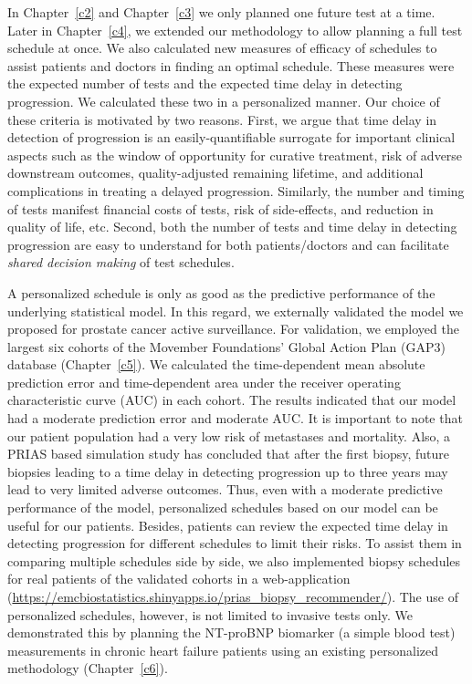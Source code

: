 In Chapter~\ref{c2} and Chapter~\ref{c3} we only planned one future test at a time. Later in Chapter~\ref{c4}, we extended our methodology to allow planning a full test schedule at once. We also calculated new measures of efficacy of schedules to assist patients and doctors in finding an optimal schedule. These measures were the expected number of tests and the expected time delay in detecting progression. We calculated these two in a personalized manner. Our choice of these criteria is motivated by two reasons. First, we argue that time delay in detection of progression is an easily-quantifiable surrogate for important clinical aspects such as the window of opportunity for curative treatment, risk of adverse downstream outcomes, quality-adjusted remaining lifetime, and additional complications in treating a delayed progression. Similarly, the number and timing of tests manifest financial costs of tests, risk of side-effects, and reduction in quality of life, etc. Second, both the number of tests and time delay in detecting progression are easy to understand for both patients/doctors and can facilitate \emph{shared decision making} of test schedules.

A personalized schedule is only as good as the predictive performance of the underlying statistical model. In this regard, we externally validated the model we proposed for prostate cancer active surveillance. For validation, we employed the largest six cohorts of the Movember Foundations' Global Action Plan (GAP3) database (Chapter~\ref{c5}). We calculated the time-dependent mean absolute prediction error and time-dependent area under the receiver operating characteristic curve (AUC) in each cohort. The results indicated that our model had a moderate prediction error and moderate AUC. It is important to note that our patient population had a very low risk of metastases and mortality. Also, a PRIAS based simulation study has concluded that after the first biopsy, future biopsies leading to a time delay in detecting progression up to three years may lead to very limited adverse outcomes. Thus, even with a moderate predictive performance of the model, personalized schedules based on our model can be useful for our patients. Besides, patients can review the expected time delay in detecting progression for different schedules to limit their risks. To assist them in comparing multiple schedules side by side, we also implemented biopsy schedules for real patients of the validated cohorts in a web-application (\url{https://emcbiostatistics.shinyapps.io/prias_biopsy_recommender/}). The use of personalized schedules, however, is not limited to invasive tests only. We demonstrated this by planning the NT-proBNP biomarker (a simple blood test) measurements in chronic heart failure patients using an existing personalized methodology (Chapter~\ref{c6}).